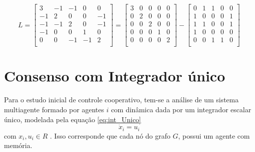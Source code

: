 \begin{equation}\label{eq:matriz_L1}
    L = \begin{bmatrix}
         3 & -1 & -1 & 0 & 0 \\ 
         -1 & 2 & 0 & 0 & -1 \\ 
         -1 & -1 & 2 & 0 & -1 \\ 
         -1 & 0 & 0 & 1 & 0 \\ 
         0 & 0 & -1 & -1 & 2 \\ 
    \end{bmatrix}
    = \begin{bmatrix}
         3 & 0 & 0 & 0 & 0 \\ %
         0 & 2 & 0 & 0 & 0 \\ %
         0 & 0 & 2 & 0 & 0 \\ %
         0 & 0 & 0 & 1 & 0 \\ %
         0 & 0 & 0 & 0 & 2 \\ %
    \end{bmatrix}
    - \begin{bmatrix}
         0 & 1 & 1 & 0 & 0 \\ %
         1 & 0 & 0 & 0 & 1 \\ %
         1 & 1 & 0 & 0 & 1 \\ %
         1 & 0 & 0 & 0 & 0 \\ %
         0 & 0 & 1 & 1 & 0 \\ %
    \end{bmatrix}
\end{equation}


\section{Consenso com Integrador único}
Para o estudo inicial de controle cooperativo, tem-se a análise de um sistema multiagente formado por agentes $i$ com dinâmica dada por um integrador escalar único, modelada pela equação \ref{eq:int_Unico}
\begin{equation}\label{eq:int_Unico}
    \dot x_{i}  = u_{i} 
\end{equation}
com $x_{i}, u_{i} \in R $ . Isso corresponde que cada nó do grafo $G$, possui um agente com memória.

